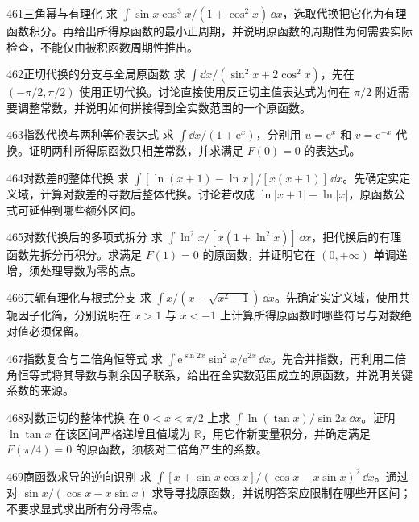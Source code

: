 \begin{exercise}{461}{三角幂与有理化}
求 $\int\sin x\cos^3x/(1+\cos^2x)\,\dd x$，选取代换把它化为有理函数积分。再给出所得原函数的最小正周期，并说明原函数的周期性为何需要实际检查，不能仅由被积函数周期性推出。
\end{exercise}
\begin{exercise}{462}{正切代换的分支与全局原函数}
求 $\int\dd x/(\sin^2x+2\cos^2x)$，先在 $(-\pi/2,\pi/2)$ 使用正切代换。讨论直接使用反正切主值表达式为何在 $\pi/2$ 附近需要调整常数，并说明如何拼接得到全实数范围的一个原函数。
\end{exercise}
\begin{exercise}{463}{指数代换与两种等价表达式}
求 $\int\dd x/(1+\mathrm e^x)$，分别用 $u=\mathrm e^x$ 和 $v=\mathrm e^{-x}$ 代换。证明两种所得原函数只相差常数，并求满足 $F(0)=0$ 的表达式。
\end{exercise}
\begin{exercise}{464}{对数差的整体代换}
求 $\int[\ln(x+1)-\ln x]/[x(x+1)]\,\dd x$。先确定实定义域，计算对数差的导数后整体代换。讨论若改成 $\ln|x+1|-\ln|x|$，原函数公式可延伸到哪些额外区间。
\end{exercise}
\begin{exercise}{465}{对数代换后的多项式拆分}
求 $\int\ln^2x/[x(1+\ln^2x)]\,\dd x$，把代换后的有理函数先拆分再积分。求满足 $F(1)=0$ 的原函数，并证明它在 $(0,+\infty)$ 单调递增，须处理导数为零的点。
\end{exercise}
\begin{exercise}{466}{共轭有理化与根式分支}
求 $\int x/(x-\sqrt{x^2-1})\,\dd x$。先确定实定义域，使用共轭因子化简，分别说明在 $x>1$ 与 $x<-1$ 上计算所得原函数时哪些符号与对数绝对值必须保留。
\end{exercise}
\begin{exercise}{467}{指数复合与二倍角恒等式}
求 $\int\mathrm e^{\sin2x}\sin^2x/\mathrm e^{2x}\,\dd x$。先合并指数，再利用二倍角恒等式将其导数与剩余因子联系，给出在全实数范围成立的原函数，并说明关键系数的来源。
\end{exercise}
\begin{exercise}{468}{对数正切的整体代换}
在 $0<x<\pi/2$ 上求 $\int\ln(\tan x)/\sin2x\,\dd x$。证明 $\ln\tan x$ 在该区间严格递增且值域为 $\mathbb R$，用它作新变量积分，并确定满足 $F(\pi/4)=0$ 的原函数，须核对二倍角产生的系数。
\end{exercise}
\begin{exercise}{469}{商函数求导的逆向识别}
求 $\int[x+\sin x\cos x]/(\cos x-x\sin x)^2\,\dd x$。通过对 $\sin x/(\cos x-x\sin x)$ 求导寻找原函数，并说明答案应限制在哪些开区间；不要求显式求出所有分母零点。
\end{exercise}
